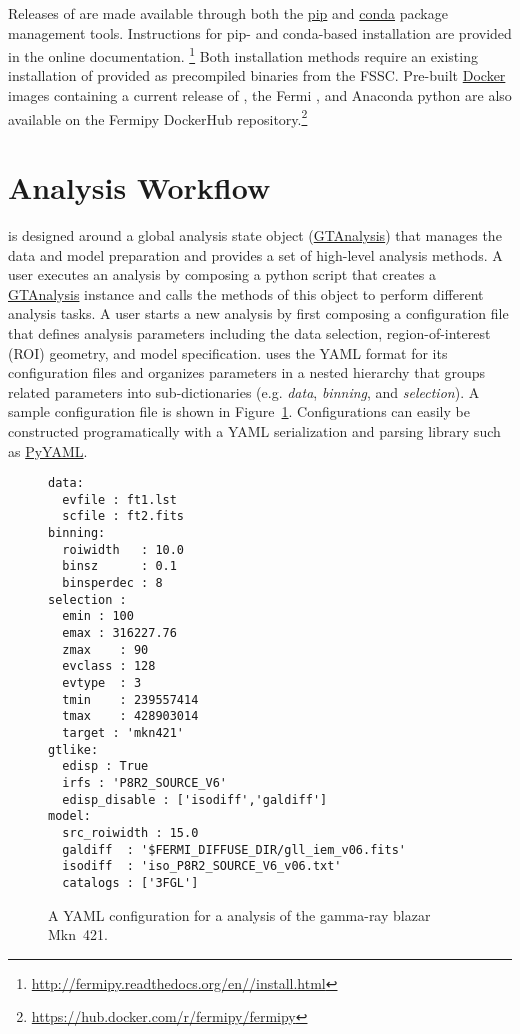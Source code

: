 \documentclass{PoS}
\newcommand{\url}[1]{\href{#1}{#1}}
\begin{document}
Releases of {\fermipy} are made available through both the
\href{https://pip.pypa.io/en/latest/}{pip} and
\href{https://conda.io/docs/index.html}{conda} package management
tools.  Instructions for pip- and conda-based installation are
provided in the online documentation.
\footnote{\url{http://fermipy.readthedocs.org/en/\version/install.html}}
Both installation methods require an existing installation of
{\stools} provided as precompiled binaries from the FSSC.  Pre-built
\href{https://www.docker.com}{Docker} images containing a current
release of {\fermipy}, the Fermi {\stools}, and Anaconda python are
also available on the Fermipy DockerHub
repository.\footnote{\url{https://hub.docker.com/r/fermipy/fermipy}}

\section{Analysis Workflow}\label{sec:analysis}

{\fermipy} is designed around a global analysis state object
(\href{http://fermipy.readthedocs.io/en/\version/fermipy.html\#fermipy.gtanalysis.GTAnalysis}{GTAnalysis})
that manages the data and model preparation and provides a set of
high-level analysis methods.  A user executes an analysis by composing
a python script that creates a
\href{http://fermipy.readthedocs.io/en/\version/fermipy.html\#fermipy.gtanalysis.GTAnalysis}{GTAnalysis}
instance and calls the methods of this object to perform different
analysis tasks.  A user starts a new analysis by first composing a
configuration file that defines analysis parameters including the data
selection, region-of-interest (ROI) geometry, and model specification.
{\fermipy} uses the YAML format for its configuration files and
organizes parameters in a nested hierarchy that groups related
parameters into sub-dictionaries (e.g. \textit{data},
\textit{binning}, and \textit{selection}).
A sample configuration file is shown
in Figure~\ref{fig:fermipy_config}.  Configurations can easily be
constructed programatically with a YAML serialization and parsing
library such as \href{http://pyyaml.org/wiki/PyYAML}{PyYAML}.

\begin{figure}[t]
\begin{lstlisting}
data:
  evfile : ft1.lst
  scfile : ft2.fits
binning:
  roiwidth   : 10.0
  binsz      : 0.1
  binsperdec : 8
selection :
  emin : 100
  emax : 316227.76
  zmax    : 90
  evclass : 128
  evtype  : 3
  tmin    : 239557414
  tmax    : 428903014
  target : 'mkn421'
gtlike:
  edisp : True
  irfs : 'P8R2_SOURCE_V6'
  edisp_disable : ['isodiff','galdiff']
model:
  src_roiwidth : 15.0
  galdiff  : '$FERMI_DIFFUSE_DIR/gll_iem_v06.fits'
  isodiff  : 'iso_P8R2_SOURCE_V6_v06.txt'
  catalogs : ['3FGL']
\end{lstlisting}
\caption{A YAML configuration for a {\fermipy} analysis of the gamma-ray blazar Mkn~421.\label{fig:fermipy_config}}
\end{figure}
\end{document}
